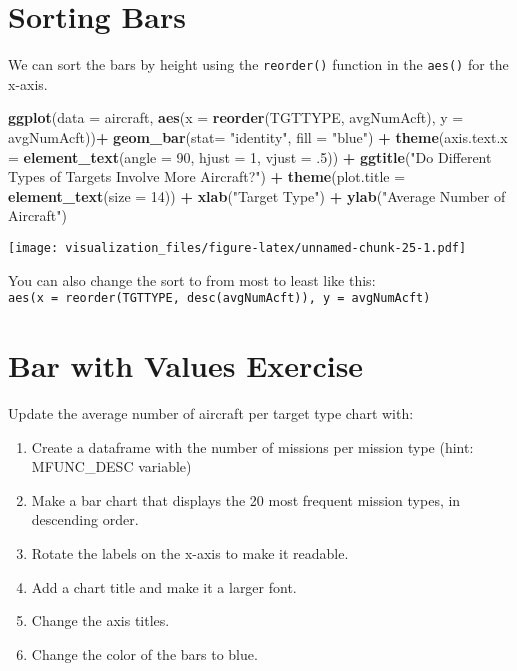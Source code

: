 \documentclass[oneside]{memoir}
\newenvironment{Shaded}{\begin{snugshade}}{\end{snugshade}}
\newcommand{\KeywordTok}[1]{\textcolor[rgb]{0.13,0.29,0.53}{\textbf{#1}}}
\newcommand{\DataTypeTok}[1]{\textcolor[rgb]{0.13,0.29,0.53}{#1}}
\newcommand{\DecValTok}[1]{\textcolor[rgb]{0.00,0.00,0.81}{#1}}
\newcommand{\StringTok}[1]{\textcolor[rgb]{0.31,0.60,0.02}{#1}}
\newcommand{\OperatorTok}[1]{\textcolor[rgb]{0.81,0.36,0.00}{\textbf{#1}}}
\newcommand{\NormalTok}[1]{#1}
\theoremstyle{definition}
\theoremstyle{definition}
\theoremstyle{definition}
\theoremstyle{remark}
\begin{document}
\section{Sorting Bars}\label{sorting-bars}

We can sort the bars by height using the \texttt{reorder()} function in
the \texttt{aes()} for the x-axis.

\begin{Shaded}
\begin{Highlighting}[]
\KeywordTok{ggplot}\NormalTok{(}\DataTypeTok{data =}\NormalTok{ aircraft, }\KeywordTok{aes}\NormalTok{(}\DataTypeTok{x =} \KeywordTok{reorder}\NormalTok{(TGTTYPE, avgNumAcft), }\DataTypeTok{y =}\NormalTok{ avgNumAcft))}\OperatorTok{+}
\StringTok{  }\KeywordTok{geom_bar}\NormalTok{(}\DataTypeTok{stat=} \StringTok{"identity"}\NormalTok{, }\DataTypeTok{fill =} \StringTok{"blue"}\NormalTok{) }\OperatorTok{+}
\StringTok{  }\KeywordTok{theme}\NormalTok{(}\DataTypeTok{axis.text.x =} \KeywordTok{element_text}\NormalTok{(}\DataTypeTok{angle =} \DecValTok{90}\NormalTok{, }\DataTypeTok{hjust =} \DecValTok{1}\NormalTok{, }\DataTypeTok{vjust =}\NormalTok{ .}\DecValTok{5}\NormalTok{)) }\OperatorTok{+}
\StringTok{  }\KeywordTok{ggtitle}\NormalTok{(}\StringTok{"Do Different Types of Targets Involve More Aircraft?"}\NormalTok{) }\OperatorTok{+}
\StringTok{  }\KeywordTok{theme}\NormalTok{(}\DataTypeTok{plot.title =} \KeywordTok{element_text}\NormalTok{(}\DataTypeTok{size =} \DecValTok{14}\NormalTok{)) }\OperatorTok{+}
\StringTok{  }\KeywordTok{xlab}\NormalTok{(}\StringTok{"Target Type"}\NormalTok{) }\OperatorTok{+}
\StringTok{  }\KeywordTok{ylab}\NormalTok{(}\StringTok{"Average Number of Aircraft"}\NormalTok{)}
\end{Highlighting}
\end{Shaded}

\texttt{[image: visualization\_files/figure-latex/unnamed-chunk-25-1.pdf]}

You can also change the sort to from most to least like this:
\texttt{aes(x\ =\ reorder(TGTTYPE,\ desc(avgNumAcft)),\ y\ =\ avgNumAcft)}

\section{Bar with Values Exercise}\label{bar-with-values-exercise}

Update the average number of aircraft per target type chart with:

\begin{enumerate}
\def\labelenumi{\arabic{enumi}.}
\item
  Create a dataframe with the number of missions per mission type (hint:
  MFUNC\_DESC variable)
\item
  Make a bar chart that displays the 20 most frequent mission types, in
  descending order.
\item
  Rotate the labels on the x-axis to make it readable.
\item
  Add a chart title and make it a larger font.
\item
  Change the axis titles.
\item
  Change the color of the bars to blue.
\end{enumerate}
\end{document}
